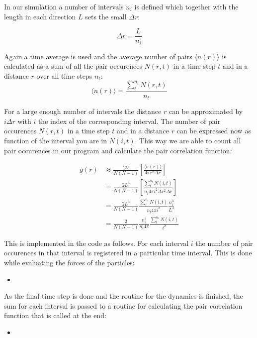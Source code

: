 \documentclass[
10pt, %
a4paper, %
oneside, %
headinclude,footinclude, %
BCOR5mm, %
]{scrartcl}
\newcommand{\insertcode}[2]{\begin{itemize}\item[]\end{itemize}} %
\begin{document}
\noindent
In our simulation a number of intervals $n_i$ is defined which together with the length in each direction $L$ sets the small $\Delta r$:

\begin{equation} \Delta r  = \frac{L}{n_i} \end{equation}

\noindent
Again a time average is used and the average number of pairs $\langle n(r) \rangle $ is calculated as a sum of all the pair occurences $N(r,t)$ in a time step $t$ and in a distance $r$ over all time steps $n_t$:
\begin{equation} \langle n(r) \rangle = \frac{\sum_t^{n_t} N(r,t)}{n_t} \end{equation}

\noindent
For a large enough number of intervals the distance $r$ can be approximated by $i\Delta r$ with $i$ the index of the corresponding interval. The number of pair occurences $N(r,t)$ in a time step $t$ and in a distance $r$ can be expressed now as function of the interval you are in $N(i,t)$. This way we are able to count all pair occurences in our program and calculate the pair correlation function:

\begin{align}
g(r) &\approx \frac{2V}{N(N-1)} \left [ \frac{\langle n(r) \rangle }{ 4 \pi r^2 \Delta r} \right ] \\
&= \frac{2L^3}{N(N-1)} \left [ \frac{\sum_t^{n_t} N(i,t)}{n_t 4 \pi i^2 \Delta r^2 \Delta r} \right ] \\
&= \frac{2L^3}{N(N-1)} \frac{\sum_t^{n_t} N(i,t)}{n_t 4 \pi i^2} \frac{n_i^3}{L^3} \\
&= \frac{2}{N(N-1)} \frac{n_i^3}{n_t 4 \pi} \frac{\sum_t^{n_t} N(i,t)}{i^2}
\end{align}

\noindent
This is implemented in the code as follows. For each interval $i$ the number of pair occurences in that interval is registered in a particular time interval. This is done while evaluating the forces of the particles:
\insertcode{"Scripts/pair_correlation_snippet_1.f90"}{Updating the histogram for each interval} %

\noindent
As the final time step is done and the routine for the dynamics is finished, the sum for each interval is passed to a routine for calculating the pair correlation function that is called at the end:
\insertcode{"Scripts/pair_correlation_snippet_2.f90"}{Factors are needed to prevent overflow errors} %
\end{document}
